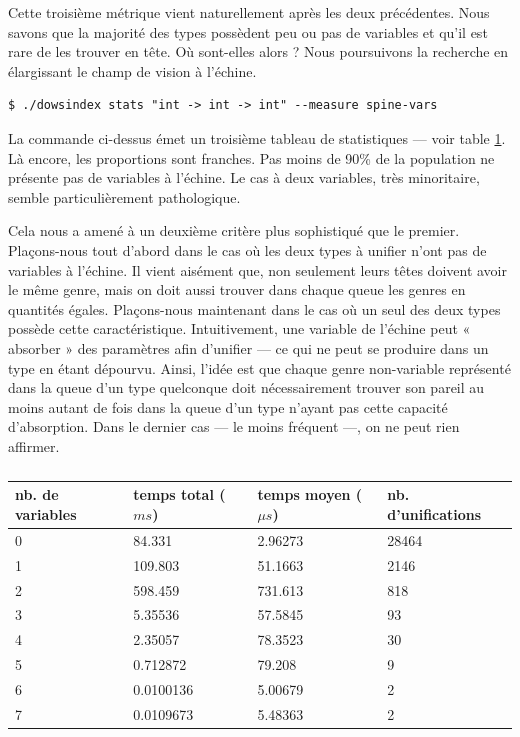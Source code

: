 \documentclass[a4paper]{report}
\theoremstyle{definition}
\begin{document}
Cette troisième métrique vient naturellement après les deux précédentes. Nous savons que la majorité des types possèdent peu ou pas de variables et qu'il est rare de les trouver en tête. Où sont-elles alors ? Nous poursuivons la recherche en élargissant le champ de vision à l'échine.

\begin{verbatim}
$ ./dowsindex stats "int -> int -> int" --measure spine-vars
\end{verbatim}

La commande ci-dessus émet un troisième tableau de statistiques — voir table \ref{tab_meas3}. Là encore, les proportions sont franches. Pas moins de 90\% de la population ne présente pas de variables à l'échine. Le cas à deux variables, très minoritaire, semble particulièrement pathologique.

Cela nous a amené à un deuxième critère plus sophistiqué que le premier. Plaçons-nous tout d'abord dans le cas où les deux types à unifier n'ont pas de variables à l'échine. Il vient aisément que, non seulement leurs têtes doivent avoir le même genre, mais on doit aussi trouver dans chaque queue les genres en quantités égales. Plaçons-nous maintenant dans le cas où un seul des deux types possède cette caractéristique. Intuitivement, une variable de l'échine peut « absorber » des paramètres afin d'unifier — ce qui ne peut se produire dans un type en étant dépourvu. Ainsi, l'idée est que chaque genre non-variable représenté dans la queue d'un type quelconque doit nécessairement trouver son pareil au moins autant de fois dans la queue d'un type n'ayant pas cette capacité d'absorption. Dans le dernier cas — le moins fréquent —, on ne peut rien affirmer.

\begin{table}[h]
  \centering
  \begin{tabular}{|l|l|l|l|}
    \hline
      nb. de variables &
      temps total ($ms$) &
      temps moyen ($\mu s$) &
      nb. d'unifications
    \\
    \hline
      0 & 84.331 & 2.96273 & 28464
    \\
      1 & 109.803 & 51.1663 & 2146
    \\
      2 & 598.459 & 731.613 & 818
    \\
      3 & 5.35536 & 57.5845 & 93
    \\
      4 & 2.35057 & 78.3523 & 30
    \\
      5 & 0.712872 & 79.208 & 9
    \\
      6 & 0.0100136 & 5.00679 & 2
    \\
      7 & 0.0109673 & 5.48363 & 2
    \\
    \hline
  \end{tabular}
  \caption{\label{tab_meas3}}
\end{table}
\end{document}

